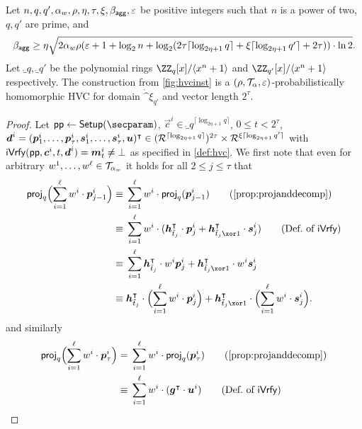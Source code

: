 \begin{lemma}\label{lem:hvcprobhom}
  Let $n,q,q',\alpha_w,\rho,\eta,\tau,\xi,\beta_{\mathsf{agg}},\varepsilon$ be positive integers such that $n$ is a power of two, $q,q'$ are prime, and \[\beta_{\mathsf{agg}} \geq \eta\sqrt{2\alpha_w\rho(\varepsilon+1+\log_2 n + \log_2(2\tau \lceil\log_{2\eta+1}q\rceil + \xi\lceil\log_{2\eta+1}q'\rceil + 2\tau))\cdot\ln2}.\]
  Let $\ring_q,\ring_{q'}$ be the polynomial rings $\ZZ_q[x]/\langle x^n+1\rangle$ and $\ZZ_{q'}[x]/\langle x^n+1\rangle$ respectively.
  The construction from \autoref{fig:hvcinst} is a $(\rho,\mathcal{T}_\alpha,\varepsilon)$-probabilistically homomorphic HVC for domain $\ring^\xi_{q'}$ and vector length $2^\tau$.
\end{lemma}
\begin{proof}
Let $\params \gets \setup(\secparam)$, $\vec{c}^i \in \ring_q^{\lceil\log_{2\eta+1} q\rceil}$, $0 \leq t < 2^\tau$, $\boldsymbol{d}^i = (\boldsymbol{p}^i_1,\dots,\boldsymbol{p}^i_{\tau},\boldsymbol{s}^i_1, \dots, \boldsymbol{s}^i_{\tau},\boldsymbol{u})^\intercal\in (\mathcal{R}^{\lceil\log_{2\eta+1} q\rceil})^{2\tau} \times \mathcal{R}^{\xi\lceil\log_{2\eta+1} q'\rceil}$ with $\mathsf{iVrfy}(\mathsf{pp},\boldsymbol{c}^i,t,\boldsymbol{d}^i) = \boldsymbol{m}_t^i \neq \bot$
as specified in \autoref{def:hvc}.
%
We first note that even for arbitrary $w^1,\dots,w^{\ell}\in\mathcal{T}_{\alpha_w}$ it holds for all $2\leq j\leq \tau$ that
\begin{align*}
  \proj_q\Bigl(\sum_{i=1}^{\ell}w^i\cdot\vec{p}_{j-1}^i\Bigr) \equiv{}&\sum_{i=1}^{\ell}w^i\cdot\proj_q(\vec{p}_{j-1}^i)\tag{\autoref{prop:projanddecomp}}\\
  \equiv{}&\sum_{i=1}^{\ell}w^i\cdot(\vec{h}_{\tilde t_j}^\transpose\cdot \vec{p}^i_{j} + \vec{h}_{\tilde t_j\xor 1}^\transpose \cdot \vec{s}^i_{j})\tag{Def.\ of $\iverify$}\\
  \equiv{}&\sum_{i=1}^{\ell}\vec{h}_{\tilde t_j}^\transpose\cdot w^i \vec{p}^i_{j} + \vec{h}_{\tilde t_j\xor 1}^\transpose\cdot w^i  \vec{s}^i_{j}\\  
  \equiv{}& \vec{h}_{\tilde t_j}^\transpose\cdot \Bigl(\sum_{i=1}^{\ell}w^i\cdot\vec{p}^i_{j}\Bigr) + \vec{h}_{\tilde t_j \xor 1}^\transpose \cdot \Bigl(\sum_{i=1}^{\ell}w^i\cdot\vec{s}^i_{j}\Bigr).
\end{align*}
and similarly
\begin{align*}
  \proj_q\Bigl(\sum_{i=1}^{\ell}w^i\cdot\vec{p}_{\tau}^i\Bigr) ={}&\sum_{i=1}^{\ell}w^i\cdot\proj_q(\vec{p}_{\tau}^i)\tag{\autoref{prop:projanddecomp}}\\
  \equiv{}&\sum_{i=1}^{\ell}w^i\cdot(\vec{g}^\transpose\cdot \vec{u}^i)\tag{Def.\ of $\iverify$}\\

\end{align*}
\end{proof}
